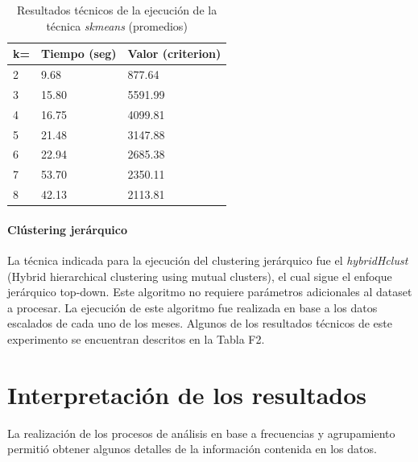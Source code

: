 \documentclass[12pt]{article}
\numberwithin{equation}{section}
\numberwithin{table}{section}
\numberwithin{figure}{section}
\begin{document}
\begin{table}[h]
\begin{tabular}{@{}lll@{}}
\toprule
\multicolumn{1}{c}{k=} & \multicolumn{1}{c}{Tiempo (seg)} & \multicolumn{1}{c}{Valor (criterion)} \\ \midrule
2                      & 9.68                            & 877.64                               \\
3                      & 15.80                            & 5591.99                              \\
4                      & 16.75                            & 4099.81                              \\
5                      & 21.48                            & 3147.88                              \\
6                      & 22.94                            & 2685.38                              \\
7                      & 53.70                            & 2350.11                              \\
8                      & 42.13                            & 2113.81                              \\ \bottomrule
\end{tabular}
\caption{Resultados técnicos de la ejecución de la técnica \emph{skmeans} (promedios)}
\label{tbl:resultados-particional}
\end{table}



\paragraph{Clústering jerárquico}
La técnica indicada para la ejecución del clustering jerárquico fue el \emph{hybridHclust} (Hybrid hierarchical clustering using mutual clusters), el cual sigue el enfoque jerárquico top-down. Este algoritmo no requiere parámetros adicionales al dataset a procesar.
La ejecución de este algoritmo fue realizada en base a los datos escalados de cada uno de los meses.
Algunos de los resultados técnicos de este experimento se encuentran descritos en la Tabla F2.

\section{Interpretación de los resultados}
La realización de los procesos de análisis en base a frecuencias y agrupamiento permitió obtener algunos detalles de la información contenida en los datos.
\end{document}
